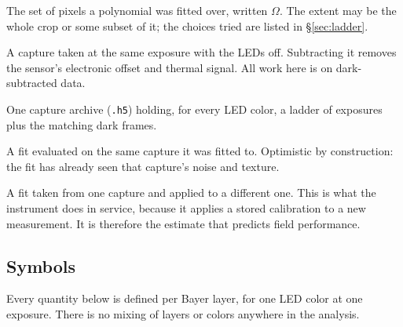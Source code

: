 \documentclass[11pt, a4paper]{article}
\newcommand{\code}[1]{\texttt{#1}}
\begin{document}
\begin{description}[style=nextline, leftmargin=1em]
\item[Extent]
  The set of pixels a polynomial was fitted over,
  written $\Omega$.
  The extent may be the whole crop or some subset of it;
  the choices tried are listed in \S\ref{sec:ladder}.

\item[Dark frame]
  A capture taken at the same exposure with the LEDs off.
  Subtracting it removes the sensor's electronic offset and thermal signal.
  All work here is on dark-subtracted data.

\item[Suite]
  One capture archive (\code{.h5}) holding,
  for every LED color,
  a ladder of exposures plus the matching dark frames.

\item[In-sample]
  A fit evaluated on the same capture it was fitted to.
  Optimistic by construction:
  the fit has already seen that capture's noise and texture.

\item[Out-of-sample, or transfer]
  A fit taken from one capture and applied to a different one.
  This is what the instrument does in service,
  because it applies a stored calibration to a new measurement.
  It is therefore the estimate that predicts field performance.

\end{description}

\subsection{Symbols}
\label{sec:symbols}

Every quantity below is defined per Bayer layer,
for one LED color at one exposure.
There is no mixing of layers or colors anywhere in the analysis.
\end{document}
